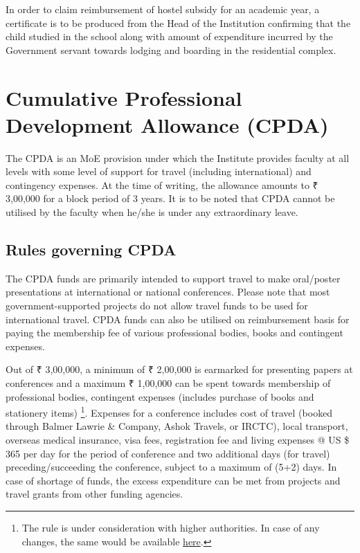 \documentclass[
  10pt,
  a5paper,
  10pt,
  openany]{amsbook}
\begin{document}
In order to claim reimbursement of hostel subsidy for an academic year,
a certificate is to be produced from the Head of the Institution
confirming that the child studied in the school along with amount of
expenditure incurred by the Government servant towards lodging and
boarding in the residential complex.

\chapter{Cumulative Professional Development Allowance
(CPDA)}\label{cumulative-professional-development-allowance-cpda}

The CPDA is an MoE provision under which the Institute provides faculty
at all levels with some level of support for travel (including
international) and contingency expenses. At the time of writing, the
allowance amounts to ₹ 3,00,000 for a block period of 3 years. It is to
be noted that CPDA cannot be utilised by the faculty when he/she is
under any extraordinary leave.

\section{Rules governing CPDA}\label{rules-governing-cpda}

The CPDA funds are primarily intended to support travel to make
oral/poster presentations at international or national conferences.
Please note that most government-supported projects do not allow travel
funds to be used for international travel. CPDA funds can also be
utilised on reimbursement basis for paying the membership fee of various
professional bodies, books and contingent expenses.

Out of ₹ 3,00,000, a minimum of ₹ 2,00,000 is earmarked for presenting
papers at conferences and a maximum ₹ 1,00,000 can be spent towards
membership of professional bodies, contingent expenses (includes
purchase of books and stationery items) \footnote{The rule is under
  consideration with higher authorities. In case of any changes, the
  same would be available
  \href{https://surveys.iitb.ac.in/mod/page/view.php?id=4220\#tutorial6}{here}.}.
Expenses for a conference includes cost of travel (booked through Balmer
Lawrie \& Company, Ashok Travels, or IRCTC), local transport, overseas
medical insurance, visa fees, registration fee and living expenses @ US
\$ 365 per day for the period of conference and two additional days (for
travel) preceding/succeeding the conference, subject to a maximum of
(5+2) days. In case of shortage of funds, the excess expenditure can be
met from projects and travel grants from other funding agencies.
\end{document}
